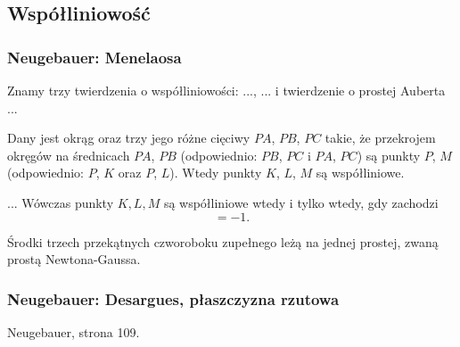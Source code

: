 
\subsection{Współliniowość}
\subsubsection{Neugebauer: Menelaosa}
Znamy trzy twierdzenia o współliniowości: ..., ... i twierdzenie o prostej Auberta ...

\begin{proposition}
	Dany jest okrąg oraz trzy jego różne cięciwy $PA$, $PB$, $PC$ takie, że przekrojem okręgów na średnicach $PA$, $PB$ (odpowiednio: $PB$, $PC$ i $PA$, $PC$) są punkty $P$, $M$ (odpowiednio: $P$, $K$ oraz $P$, $L$).
	Wtedy punkty $K$, $L$, $M$ są współliniowe.
\end{proposition}

\begin{proposition}
	...
	Wówczas punkty $K, L, M$ są współliniowe wtedy i tylko wtedy, gdy zachodzi
	\begin{equation}
		[AMB] [BKC] [CLA] = -1.
	\end{equation}
\end{proposition}



\begin{proposition}
	Środki trzech przekątnych czworoboku zupełnego leżą na jednej prostej, zwaną prostą Newtona-Gaussa.
\end{proposition}

\subsubsection{Neugebauer: Desargues, płaszczyzna rzutowa}

\begin{proposition}
	Neugebauer, strona 109.
\end{proposition}

